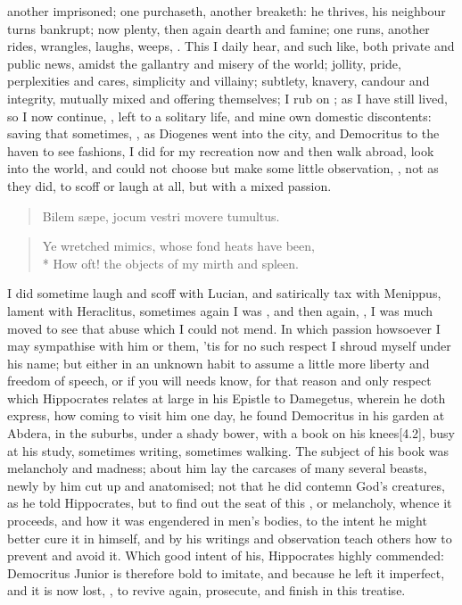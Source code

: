 {another imprisoned; one purchaseth, another breaketh: he thrives, his
neighbour turns bankrupt; now plenty, then again dearth and famine; one
runs, another rides, wrangles, laughs, weeps, \etc. This I daily hear,
and such like, both private and public news, amidst the gallantry and
misery of the world; jollity, pride, perplexities and cares, simplicity
and villainy; subtlety, knavery, candour and integrity, mutually mixed
and offering themselves; I rub on ; as I have still
lived, so I now continue, , left to a solitary life, and
mine own domestic discontents: saving that sometimes, ,
as Diogenes went into the city, and Democritus to the haven to see
fashions, I did for my recreation now and then walk abroad, look into
the world, and could not choose but make some little observation, , not as they did, to
scoff or laugh at all, but with a mixed passion.
%
\begin{latin}
\begin{verse}
Bilem s\ae{}pe, jocum vestri movere tumultus.
\end{verse}
\end{latin}
\translationrule%
\begin{verse}
Ye wretched mimics, whose fond heats have been,\\*
How oft! the objects of my mirth and spleen.
\end{verse}

I did sometime laugh and scoff with Lucian, and satirically tax with
Menippus, lament with Heraclitus, sometimes again I was , and then again, , I was much
moved to see that abuse which I could not mend. In which passion
howsoever I may sympathise with him or them, 'tis for no such respect I
shroud myself under his name; but either in an unknown habit to assume
a little more liberty and freedom of speech, or if you will needs know,
for that reason and only respect which Hippocrates relates at large in
his Epistle to Damegetus, wherein he doth express, how coming to visit
him one day, he found Democritus in his garden at Abdera, in the
suburbs, under a shady bower, with a book on his knees[4.2\baselineskip], busy at
his study, sometimes writing, sometimes walking. The subject of his
book was melancholy and madness; about him lay the carcases of many
several beasts, newly by him cut up and anatomised; not that he did
contemn God's creatures, as he told Hippocrates, but to find out the
seat of this , or melancholy, whence it proceeds, and how it
was engendered in men's bodies, to the intent he might better cure it
in himself, and by his writings and observation teach others how to
prevent and avoid it. Which good intent of his, Hippocrates highly
commended: Democritus Junior is therefore bold to imitate, and because
he left it imperfect, and it is now lost, , to revive again, prosecute, and finish in this treatise.

}
